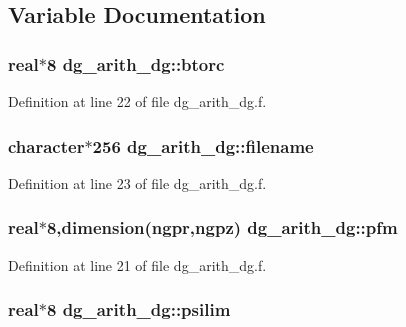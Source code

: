 \subsection{Variable Documentation}
\hypertarget{namespacedg__arith__dg_7a992e5a439388ce2c9624a01757a066}{
\subsubsection[btorc]{\setlength{\rightskip}{0pt plus 5cm}real$\ast$8 {\bf dg\_\-arith\_\-dg::btorc}}}
\label{namespacedg__arith__dg_7a992e5a439388ce2c9624a01757a066}




Definition at line 22 of file dg\_\-arith\_\-dg.f.\hypertarget{namespacedg__arith__dg_e5e4ec783b359df8e12cc4bda2a44ea1}{
\subsubsection[filename]{\setlength{\rightskip}{0pt plus 5cm}character$\ast$256 {\bf dg\_\-arith\_\-dg::filename}}}
\label{namespacedg__arith__dg_e5e4ec783b359df8e12cc4bda2a44ea1}




Definition at line 23 of file dg\_\-arith\_\-dg.f.\hypertarget{namespacedg__arith__dg_1b7f6dcfe1f48dfc989814a1519c6719}{
\subsubsection[pfm]{\setlength{\rightskip}{0pt plus 5cm}real$\ast$8,dimension(ngpr,ngpz) {\bf dg\_\-arith\_\-dg::pfm}}}
\label{namespacedg__arith__dg_1b7f6dcfe1f48dfc989814a1519c6719}




Definition at line 21 of file dg\_\-arith\_\-dg.f.\hypertarget{namespacedg__arith__dg_456997baf11ae7fdf46a2643ced4568f}{
\subsubsection[psilim]{\setlength{\rightskip}{0pt plus 5cm}real$\ast$8 {\bf dg\_\-arith\_\-dg::psilim}}}
\label{namespacedg__arith__dg_456997baf11ae7fdf46a2643ced4568f}




